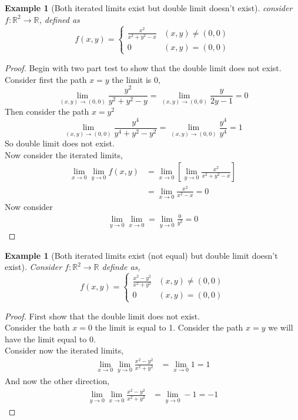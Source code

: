 \documentclass[oneside,11pt,pdftex]{book}%
\numberwithin{equation}{section}
\newtheorem{example}[theorem]{Example}
\numberwithin{section}{chapter}
\numberwithin{equation}{chapter}
\newcommand{\R}{\mathbb{R}}
\begin{document}
\begin{example}[Both iterated limits exist but double limit doesn't exist]
	consider $ f: \R^2 \rightarrow \R  $, defined as 
	\[ f(x,y)=\begin{cases}
		\frac{x^2}{x^2+y^2-x} & (x,y)\neq (0,0)\\
		0 & (x,y)=(0,0)
	\end{cases} \]
\end{example}
\begin{proof}
	Begin with two part test to show that the double limit does not exist.\\
	Consider first the path $ x=y $ the limit is $ 0 $,
	\[ \lim\limits_{(x,y)\to(0,0)}\frac{y^2}{y^2+y^2-y}=\lim\limits_{(x,y)\to(0,0)}\frac{y}{2y-1}=0 \]
	Then consider the path $ x=y^2 $
	\[ \lim\limits_{(x,y)\to(0,0)}\frac{y^4}{y^4+y^2-y^2}=\lim\limits_{(x,y)\to(0,0)}\frac{y^4}{y^4}=1 \]
	So double limit does not exist. \\
	Now consider the iterated limits,
	\begin{align*}
		\lim_{x\rightarrow 0} \lim_{y \rightarrow 0} f(x,y) &= \lim_{x \rightarrow 0} \left[\lim_{y \rightarrow 0} \frac{x^2}{x^2+y^2-x}\right]\\
		&=\lim_{x\rightarrow 0} \frac{x^2}{x^2-x}=0
	\end{align*}
Now consider 
\begin{align*}
	\lim_{y \rightarrow 0} \lim_{x \rightarrow 0} = \lim_{y \rightarrow 0} \frac{0}{y^2}=0
\end{align*}
\end{proof}

\begin{example}[Both iterated limits exist (not equal) but double limit doesn't exist]
	Consider $ f: \R^2 \rightarrow \R  $ definde as,
	\[ f(x,y) = \begin{cases}
		\frac{x^2-y^2}{x^2+y^2} & (x,y)\neq (0,0)\\
		0 & (x,y)=(0,0)
	\end{cases}\]
\end{example}
\begin{proof}
	First show that the double limit does not exist.\\
	Consider the bath $ x=0 $ the limit is equal to 1. Consider the path $ x=y $ we will have the limit equal to $ 0 $.\\
	Consider now the iterated limits,
	\begin{align*}
		\lim_{x\rightarrow 0} \lim_{y \rightarrow 0} \frac{x^2-y^2}{x^2+y^2} &= \lim_{x \rightarrow 0} 1= 1
	\end{align*}
And now the other direction,
\begin{align*}
	\lim_{y \rightarrow 0 } \lim_{x \rightarrow 0} \frac{x^2-y^2}{x^2+y^2}&= \lim_{y \rightarrow 0} -1 =-1
\end{align*}
\end{proof}
\end{document}
